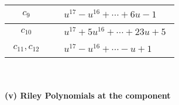 \documentclass[1p]{elsarticle_modified}
\theoremstyle{definition}
\begin{document}
\begin{tabular}{m{50pt}|m{274pt}}
\hline $$\begin{aligned}c_{9}\end{aligned}$$&$\begin{aligned}
&u^{17}- u^{16}+\cdots+6 u-1
\end{aligned}$\\
\hline $$\begin{aligned}c_{10}\end{aligned}$$&$\begin{aligned}
&u^{17}+5 u^{16}+\cdots+23 u+5
\end{aligned}$\\
\hline $$\begin{aligned}c_{11},c_{12}\end{aligned}$$&$\begin{aligned}
&u^{17}- u^{16}+\cdots- u+1
\end{aligned}$\\
\hline
\end{tabular}\\~\\
\newpage\renewcommand{\arraystretch}{1}
\flushleft \textbf{(v) Riley Polynomials at the component}\newline \\
\end{document}
